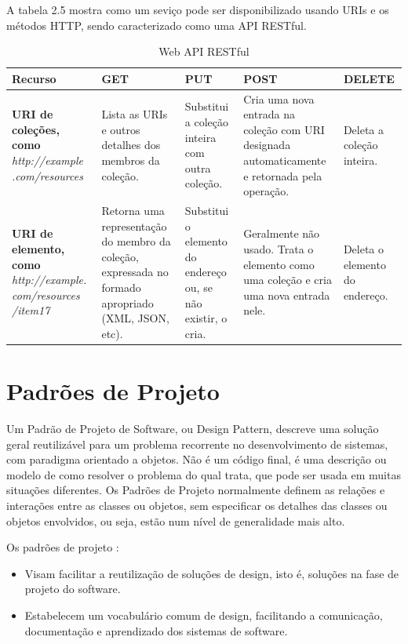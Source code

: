 A tabela 2.5 mostra como um seviço pode ser disponibilizado usando URIs e os métodos HTTP, sendo caracterizado como uma API RESTful.

\begin{table}[!h]
  \centering
	\begin{tabularx}{\textwidth}{|X|X|X|X|X|}
		\hline
			\textbf{Recurso} & \textbf{GET} & \textbf{PUT} & \textbf{POST} & \textbf{DELETE}
		\\
		\hline
			\textbf{URI de coleções, como} \textit{http://example .com/resources}
			& Lista as URIs e outros detalhes dos membros da coleção.
			& Substitui a coleção inteira com outra coleção.
		  & Cria uma nova entrada na coleção com URI designada automaticamente e retornada pela operação.
			& Deleta a coleção inteira.
		\\
		\hline
			\textbf{URI de elemento, como} \textit{http://example. com/resources /item17}
			& Retorna uma representação do membro da coleção, expressada no formado apropriado (XML, JSON, etc).
			& Substitui o elemento do endereço ou, se não existir, o cria.
		  & Geralmente não usado. Trata o elemento como uma coleção e cria uma nova entrada nele.
			& Deleta o elemento do endereço.
		\\
\hline
\end{tabularx}
\caption{Web API RESTful}
\end{table}

\section {Padrões de Projeto}

Um Padrão de Projeto de Software, ou Design Pattern, descreve uma solução geral reutilizável para um problema recorrente no desenvolvimento de sistemas, com paradigma orientado a objetos. Não é um código final, é uma descrição ou modelo de como resolver o problema do qual trata, que pode ser usada em muitas situações diferentes. Os Padrões de Projeto normalmente definem as relações e interações entre as classes ou objetos, sem especificar os detalhes das classes ou objetos envolvidos, ou seja, estão num nível de generalidade mais alto.

Os padrões de projeto :

\begin{itemize}
	\item Visam facilitar a reutilização de soluções de design, isto é, soluções na fase de projeto do software.
	\item Estabelecem um vocabulário comum de design, facilitando a comunicação, documentação e aprendizado dos sistemas de software.
\end{itemize}

